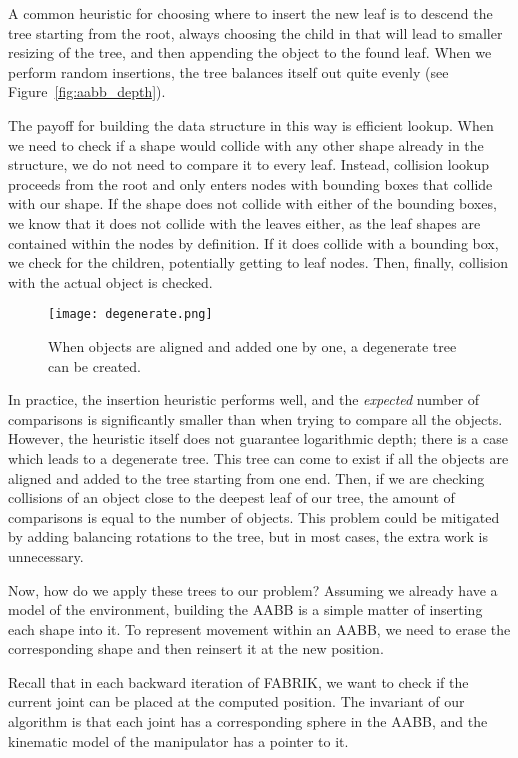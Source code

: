 A common heuristic for choosing where to insert the new leaf is to descend the tree starting from the root, always choosing the child in that will lead to smaller resizing of the tree, and then appending the object to the found leaf. When we perform random insertions, the tree balances itself out quite evenly (see Figure~\ref{fig:aabb_depth}).

The payoff for building the data structure in this way is efficient lookup. When we need to check if a shape would collide with any other shape already in the structure, we do not need to compare it to every leaf. Instead, collision lookup proceeds from the root and only enters nodes with bounding boxes that collide with our shape. If the shape does not collide with either of the bounding boxes, we know that it does not collide with the leaves either, as the leaf shapes are contained within the nodes by definition. If it does collide with a bounding box, we check for the children, potentially getting to leaf nodes. Then, finally, collision with the actual object is checked.

\begin{wrapfigure}{r}{0.4\textwidth}
  \centering
  \texttt{[image: degenerate.png]}
  \caption{When objects are aligned and added one by one, a degenerate tree can be created.}
\end{wrapfigure}

In practice, the insertion heuristic performs well, and the \textit{expected} number of comparisons is significantly smaller than when trying to compare all the objects. However, the heuristic itself does not guarantee logarithmic depth; there is a case which leads to a degenerate tree. This tree can come to exist if all the objects are aligned and added to the tree starting from one end. Then, if we are checking collisions of an object close to the deepest leaf of our tree, the amount of comparisons is equal to the number of objects. This problem could be mitigated by adding balancing rotations to the tree, but in most cases, the extra work is unnecessary.

Now, how do we apply these trees to our problem? Assuming we already have a model of the environment, building the AABB is a simple matter of inserting each shape into it. To represent movement within an AABB, we need to erase the corresponding shape and then reinsert it at the new position.

Recall that in each backward iteration of FABRIK, we want to check if the current joint can be placed at the computed position. The invariant of our algorithm is that each joint has a corresponding sphere in the AABB, and the kinematic model of the manipulator has a pointer to it.


